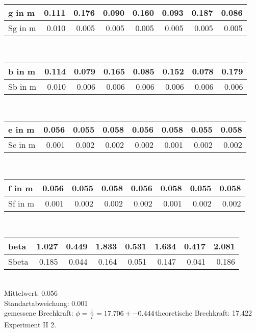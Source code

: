 	\begin{tabular}{| l | r|r|r|r|r|r|r|}
	\hline
        g in m& 0.111 & 0.176 & 0.090 & 0.160 & 0.093 & 0.187 & 0.086 \\ \hline Sg in m& 0.010 & 0.005 & 0.005 & 0.005 & 0.005 & 0.005 & 0.005 \\ \hline
	\end{tabular} \\ \vspace{3 mm} \normalsize \vspace{3 mm}
	\begin{tabular}{| l | r|r|r|r|r|r|r|}
	\hline
        b in m& 0.114 & 0.079 & 0.165 & 0.085 & 0.152 & 0.078 & 0.179 \\ \hline Sb in m& 0.010 & 0.006 & 0.006 & 0.006 & 0.006 & 0.006 & 0.006 \\ \hline
	\end{tabular} \\ \vspace{3 mm} \normalsize \vspace{3 mm}
	\begin{tabular}{| l | r|r|r|r|r|r|r|}
	\hline
        e in m& 0.056 & 0.055 & 0.058 & 0.056 & 0.058 & 0.055 & 0.058 \\ \hline Se in m& 0.001 & 0.002 & 0.002 & 0.002 & 0.001 & 0.002 & 0.002 \\ \hline
	\end{tabular} \\ \vspace{3 mm} \normalsize \vspace{3 mm}
	\begin{tabular}{| l | r|r|r|r|r|r|r|}
	\hline
        f in m& 0.056 & 0.055 & 0.058 & 0.056 & 0.058 & 0.055 & 0.058 \\ \hline Sf in m& 0.001 & 0.002 & 0.002 & 0.002 & 0.001 & 0.002 & 0.002 \\ \hline
	\end{tabular} \\ \vspace{3 mm} \normalsize \vspace{3 mm}
	\begin{tabular}{| l | r|r|r|r|r|r|r|}
	\hline
        beta& 1.027 & 0.449 & 1.833 & 0.531 & 1.634 & 0.417 & 2.081 \\ \hline Sbeta& 0.185 & 0.044 & 0.164 & 0.051 & 0.147 & 0.041 & 0.186 \\ \hline
	\end{tabular} \\ Mittelwert: 0.056\\Standartabweichung: 0.001\\gemessene Brechkraft: $\phi=\frac{1}{f}=17.706 +- 0.444\\ $theoretische Brechkraft: 17.422\\ Experiment II 2. \\ \vspace{3 mm} \normalsize \vspace{3 mm}

